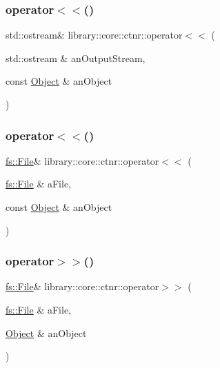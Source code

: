 \subsubsection{\texorpdfstring{operator$<$$<$()}{operator<<()}\hspace{0.1cm}{\footnotesize\ttfamily [3/4]}}
{\footnotesize\ttfamily std\+::ostream\& library\+::core\+::ctnr\+::operator$<$$<$ (\begin{DoxyParamCaption}\item[{std\+::ostream \&}]{an\+Output\+Stream,  }\item[{const \mbox{\hyperlink{classlibrary_1_1core_1_1ctnr_1_1_object}{Object}} \&}]{an\+Object }\end{DoxyParamCaption})}

\mbox{\label{namespacelibrary_1_1core_1_1ctnr_af1692b068183ff60da620deb994a8b59}} 
\subsubsection{\texorpdfstring{operator$<$$<$()}{operator<<()}\hspace{0.1cm}{\footnotesize\ttfamily [4/4]}}
{\footnotesize\ttfamily \mbox{\hyperlink{classlibrary_1_1core_1_1fs_1_1_file}{fs\+::\+File}}\& library\+::core\+::ctnr\+::operator$<$$<$ (\begin{DoxyParamCaption}\item[{\mbox{\hyperlink{classlibrary_1_1core_1_1fs_1_1_file}{fs\+::\+File}} \&}]{a\+File,  }\item[{const \mbox{\hyperlink{classlibrary_1_1core_1_1ctnr_1_1_object}{Object}} \&}]{an\+Object }\end{DoxyParamCaption})}

\mbox{\label{namespacelibrary_1_1core_1_1ctnr_a0a7da2e178e3ef26afa29284deb8de0f}} 
\subsubsection{\texorpdfstring{operator$>$$>$()}{operator>>()}}
{\footnotesize\ttfamily \mbox{\hyperlink{classlibrary_1_1core_1_1fs_1_1_file}{fs\+::\+File}}\& library\+::core\+::ctnr\+::operator$>$$>$ (\begin{DoxyParamCaption}\item[{\mbox{\hyperlink{classlibrary_1_1core_1_1fs_1_1_file}{fs\+::\+File}} \&}]{a\+File,  }\item[{\mbox{\hyperlink{classlibrary_1_1core_1_1ctnr_1_1_object}{Object}} \&}]{an\+Object }\end{DoxyParamCaption})}

